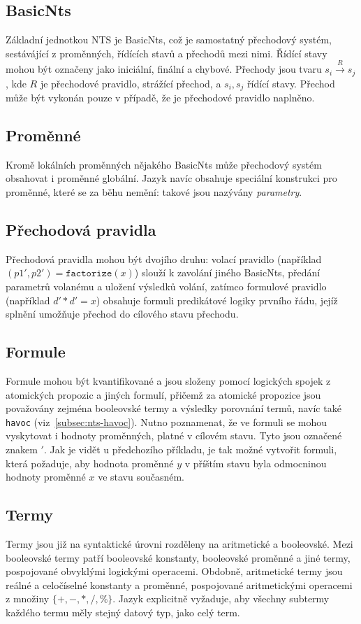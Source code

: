\documentclass[12pt]{fithesis2}
\begin{document}
\subsection{BasicNts}
Základní jednotkou NTS je BasicNts, což je samostatný přechodový systém, sestávájící z proměnných, řídících stavů a přechodů mezi nimi. Řídící stavy mohou být označeny jako iniciální, finální a chybové. Přechody jsou tvaru $s_i \overset{R}{\rightarrow} s_j$, kde $R$ je přechodové pravidlo, strážící přechod, a $s_i, s_j$ řídící stavy. Přechod může být vykonán pouze v případě, že je přechodové pravidlo naplněno.

\subsection{Proměnné}
Kromě lokálních proměnných nějakého BasicNts může přechodový systém obsahovat i proměnné globální. Jazyk navíc obsahuje speciální konstrukci pro proměnné, které se za běhu nemění: takové jsou nazývány \textit{parametry}.

\subsection{Přechodová pravidla}
Přechodová pravidla mohou být dvojího druhu: volací pravidlo (například  $(p1',p2') = \texttt{factorize} (x)$) slouží k zavolání jiného BasicNts, předání parametrů volanému a uložení výsledků volání, zatímco formulové pravidlo (například $d' * d' = x$) obsahuje formuli predikátové logiky prvního řádu, jejíž splnění umožňuje přechod do cílového stavu přechodu. 

\subsection{Formule}
Formule mohou být kvantifikované a jsou složeny pomocí logických spojek z atomických propozic a jiných formulí, přičemž za atomické propozice jsou považovány zejména booleovské termy a výsledky porovnání termů, navíc také \texttt{havoc} (viz~\ref{subsec:nts-havoc}). Nutno poznamenat, že ve formuli se mohou vyskytovat i hodnoty proměnných, platné v cílovém stavu. Tyto jsou označené znakem $\prime$. Jak je vidět u předchozího příkladu, je tak možné vytvořit formuli, která požaduje, aby hodnota proměnné $y$ v příštím stavu byla odmocninou hodnoty proměnné $x$ ve stavu současném.

\subsection{Termy}
Termy jsou již na syntaktické úrovni rozděleny na aritmetické a booleovské. Mezi booleovské termy patří booleovské konstanty, booleovské proměnné a jiné termy, pospojované obvyklými logickými operacemi. Obdobně, aritmetické termy jsou reálné a celočíselné konstanty a proměnné, pospojované aritmetickými operacemi z množiny $\{+, -, *, /, \% \}$. Jazyk explicitně vyžaduje, aby všechny subtermy každého termu měly stejný datový typ, jako celý term.
\end{document}
